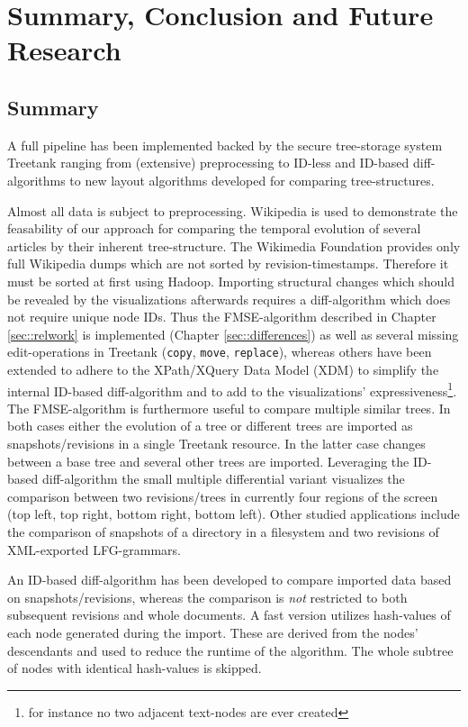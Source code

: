 \section{Summary, Conclusion and Future Research}\label{sec::conclusion}
\subsection{Summary}
A full pipeline has been implemented backed by the secure tree-storage system Treetank ranging from (extensive) preprocessing to ID-less and ID-based diff-algorithms to new layout algorithms developed for comparing tree-structures.

Almost all data is subject to preprocessing. Wikipedia is used to demonstrate the feasability of our approach for comparing the temporal evolution of several articles by their inherent tree-structure. The Wikimedia Foundation provides only full Wikipedia dumps which are not sorted by revision-timestamps. Therefore it must be sorted at first using Hadoop. Importing structural changes which should be revealed by the visualizations afterwards requires a diff-algorithm which does not require unique node IDs. Thus the FMSE-algorithm described in Chapter \ref{sec::relwork} is implemented (Chapter \ref{sec::differences}) as well as several missing edit-operations in Treetank (\texttt{copy}, \texttt{move}, \texttt{replace}), whereas others have been extended to adhere to the XPath/XQuery Data Model (XDM) to simplify the internal ID-based diff-algorithm and to add to the visualizations' expressiveness\footnote{for instance no two adjacent text-nodes are ever created}. The FMSE-algorithm is furthermore useful to compare multiple similar trees. In both cases either the evolution of a tree or different trees are imported as snapshots/revisions in a single Treetank resource. In the latter case changes between a base tree and several other trees are imported. Leveraging the ID-based diff-algorithm the small multiple differential variant visualizes the comparison between two revisions/trees in currently four regions of the screen (top left, top right, bottom right, bottom left). Other studied applications include the comparison of snapshots of a directory in a filesystem and two revisions of XML-exported LFG-grammars.

An ID-based diff-algorithm has been developed to compare imported data based on snapshots/revisions, whereas the comparison is \emph{not} restricted to both subsequent revisions and whole documents. A fast version utilizes hash-values of each node generated during the import. These are derived from the nodes' descendants and used to reduce the runtime of the algorithm. The whole subtree of nodes with identical hash-values is skipped.

